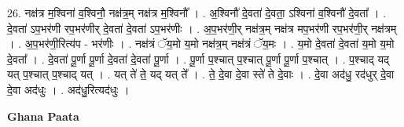 \documentclass[17pt]{extarticle}
\begin{document}
26. नक्ष॑त्र म॒श्विना॑ व॒श्विनौ॒ नक्ष॑त्र॒म् नक्ष॑त्र म॒श्विनौ᳚ । . अ॒श्विनौ॑ दे॒वता॑ दे॒वता॒ ऽश्विना॑ व॒श्विनौ॑ दे॒वता᳚ । . दे॒वता॑ ऽप॒भर॑णी रप॒भर॑णीर् दे॒वता॑ दे॒वता॑ ऽप॒भर॑णीः । . अ॒प॒भर॑णी॒र् नक्ष॑त्र॒म् नक्ष॑त्र मप॒भर॑णी रप॒भर॑णी॒र् नक्ष॑त्रम् । . अ॒प॒भर॑णी॒रित्य॑प - भर॑णीः । . नक्ष॑त्रं ॅय॒मो य॒मो नक्ष॑त्र॒म् नक्ष॑त्रं ॅय॒मः । . य॒मो दे॒वता॑ दे॒वता॑ य॒मो य॒मो दे॒वता᳚ । . दे॒वता॑ पू॒र्णा पू॒र्णा दे॒वता॑ दे॒वता॑ पू॒र्णा । . पू॒र्णा प॒श्चात् प॒श्चात् पू॒र्णा पू॒र्णा प॒श्चात् । . प॒श्चाद् यद् यत् प॒श्चात् प॒श्चाद् यत् । . यत् ते॑ ते॒ यद् यत् ते᳚ । . ते॒ दे॒वा दे॒वा स्ते॑ ते दे॒वाः । . दे॒वा अद॑धु॒ रद॑धुर् दे॒वा दे॒वा अद॑धुः । . अद॑धु॒रित्यद॑धुः । \newline

\textbf{Ghana Paata } \newline
\end{document}
